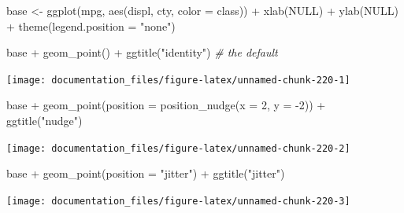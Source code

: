 \documentclass[
]{article}
\newenvironment{Shaded}{\begin{snugshade}}{\end{snugshade}}
\newcommand{\AttributeTok}[1]{\textcolor[rgb]{0.77,0.63,0.00}{#1}}
\newcommand{\CommentTok}[1]{\textcolor[rgb]{0.56,0.35,0.01}{\textit{#1}}}
\newcommand{\ConstantTok}[1]{\textcolor[rgb]{0.00,0.00,0.00}{#1}}
\newcommand{\DecValTok}[1]{\textcolor[rgb]{0.00,0.00,0.81}{#1}}
\newcommand{\FunctionTok}[1]{\textcolor[rgb]{0.00,0.00,0.00}{#1}}
\newcommand{\NormalTok}[1]{#1}
\newcommand{\OtherTok}[1]{\textcolor[rgb]{0.56,0.35,0.01}{#1}}
\newcommand{\SpecialCharTok}[1]{\textcolor[rgb]{0.00,0.00,0.00}{#1}}
\newcommand{\StringTok}[1]{\textcolor[rgb]{0.31,0.60,0.02}{#1}}
\begin{document}
\begin{Shaded}
\begin{Highlighting}[]
\NormalTok{base }\OtherTok{\textless{}{-}} \FunctionTok{ggplot}\NormalTok{(mpg, }\FunctionTok{aes}\NormalTok{(displ, cty, }\AttributeTok{color =}\NormalTok{ class)) }\SpecialCharTok{+} 
  \FunctionTok{xlab}\NormalTok{(}\ConstantTok{NULL}\NormalTok{) }\SpecialCharTok{+} \FunctionTok{ylab}\NormalTok{(}\ConstantTok{NULL}\NormalTok{) }\SpecialCharTok{+} \FunctionTok{theme}\NormalTok{(}\AttributeTok{legend.position =} \StringTok{"none"}\NormalTok{)}

\NormalTok{base }\SpecialCharTok{+} \FunctionTok{geom\_point}\NormalTok{() }\SpecialCharTok{+} \FunctionTok{ggtitle}\NormalTok{(}\StringTok{"identity"}\NormalTok{) }\CommentTok{\# the default}
\end{Highlighting}
\end{Shaded}

\begin{center}\texttt{[image: documentation\_files/figure-latex/unnamed-chunk-220-1]} \end{center}

\begin{Shaded}
\begin{Highlighting}[]
\NormalTok{base }\SpecialCharTok{+} \FunctionTok{geom\_point}\NormalTok{(}\AttributeTok{position =} \FunctionTok{position\_nudge}\NormalTok{(}\AttributeTok{x =} \DecValTok{2}\NormalTok{, }\AttributeTok{y =} \SpecialCharTok{{-}}\DecValTok{2}\NormalTok{)) }\SpecialCharTok{+} \FunctionTok{ggtitle}\NormalTok{(}\StringTok{"nudge"}\NormalTok{)}
\end{Highlighting}
\end{Shaded}

\begin{center}\texttt{[image: documentation\_files/figure-latex/unnamed-chunk-220-2]} \end{center}

\begin{Shaded}
\begin{Highlighting}[]
\NormalTok{base }\SpecialCharTok{+} \FunctionTok{geom\_point}\NormalTok{(}\AttributeTok{position =} \StringTok{"jitter"}\NormalTok{) }\SpecialCharTok{+} \FunctionTok{ggtitle}\NormalTok{(}\StringTok{"jitter"}\NormalTok{)}
\end{Highlighting}
\end{Shaded}

\begin{center}\texttt{[image: documentation\_files/figure-latex/unnamed-chunk-220-3]} \end{center}
\end{document}
